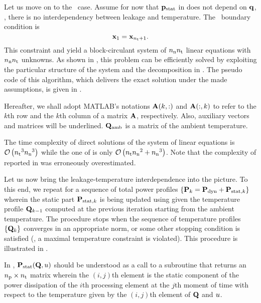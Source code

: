 Let us move on to the \dss\ case.
Assume for now that $\mathbf{p}_{\text{stat}}$ in  does not depend on $\mathbf{q}$, \ie, there is no interdependency between leakage and temperature.
The \dss\ boundary condition is
\[
  \mathbf{x}_1 = \mathbf{x}_{{n_\text{t}} + 1}.
\]
This constraint and  yield a block-circulant system of ${n_\text{n}} {n_\text{t}}$ linear equations with ${n_\text{n}} {n_\text{t}}$ unknowns.
As shown in \cite{ukhov2012}, this problem can be efficiently solved by exploiting the particular structure of the system and the decomposition in .
The pseudo code of this algorithm, which delivers the exact solution under the made assumptions, is given in .


Hereafter, we shall adopt MATLAB's notations $\mathbf{A}(k, :)$ and $\mathbf{A}(:, k)$ to refer to the $k$th row and the $k$th column of a matrix $\mathbf{A}$, respectively.
Also, auxiliary vectors and matrices will be underlined.
$\mathbf{Q}_{\text{amb}}$ is a matrix of the ambient temperature.
\begin{remark}
The time complexity of direct solutions of the system of linear equations is $\mathcal{O}\left( {n_\text{t}}^3 {n_\text{n}}^3 \right)$ while the one of  is only $\mathcal{O}\left( {n_\text{t}} {n_\text{n}}^2 + {n_\text{n}}^3 \right)$.
Note that the complexity of  reported in \cite{ukhov2012} was erroneously overestimated.
\end{remark}

Let us now bring the leakage-temperature interdependence into the picture.
To this end, we repeat  for a sequence of total power profiles $\{ \mathbf{P}_k = \mathbf{P}_{\text{dyn}} + \mathbf{P}_{\text{stat}, k} \}$ wherein the static part $\mathbf{P}_{\text{stat}, k}$ is being updated using  given the temperature profile $\mathbf{Q}_{k - 1}$ computed at the previous iteration starting from the ambient temperature.
The procedure stops when the sequence of temperature profiles $\{ \mathbf{Q}_k \}$ converges in an appropriate norm, or some other stopping condition is satisfied (\eg, a maximal temperature constraint is violated).
This procedure is illustrated in .


In , $\mathbf{P}_{\text{stat}}(\mathbf{Q}, u)$ should be understood as a call to a subroutine that returns an ${n_\text{p}} \times {n_\text{t}}$ matrix wherein the $(i, j)$th element is the static component of the power dissipation of the $i$th processing element at the $j$th moment of time with respect to the temperature given by the $(i, j)$th element of $\mathbf{Q}$ and $u$.


